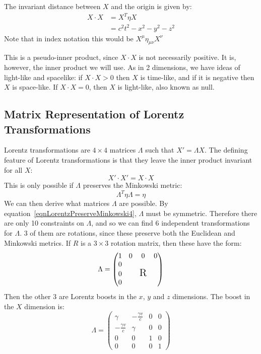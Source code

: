 \documentclass[../Main.tex]{subfiles}
\begin{document}
The invariant distance between $X$ and the origin is given by:
\begin{align*}
    X \cdot X &= X^T \eta X \\
    &= c^2 t^2 - x^2 - y^2 - z^2
\end{align*}
Note that in index notation this would be $X^\mu \eta_{\mu \nu} X^\nu$

This is a pseudo-inner product, since $X \cdot X$ is not necessarily positive. It is, however, the inner product we will use.
As in 2 dimensions, we have ideas of light-like and spacelike: if $X \cdot X > 0$ then $X$ is time-like, and if it is negative then $X$ is space-like. If $X \cdot X = 0$, then $X$ is light-like, also known as null.
\subsection{Matrix Representation of Lorentz Transformations}
Lorentz transformations are $4\times 4$ matrices $\Lambda$ such that $X' = \Lambda X$. The defining feature of Lorentz transformations is that they leave the inner product invariant for all $X$:
\begin{equation*}
    X'\cdot X' = X \cdot X
\end{equation*}
This is only possible if $\Lambda$ preserves the Minkowski metric:
\begin{equation}
    \Lambda^T \eta \Lambda = \eta
    \label{eqnLorentzPreserveMinkowski4}
\end{equation}
We can then derive what matrices $\Lambda$ are possible. By equation~\ref{eqnLorentzPreserveMinkowski4}, $\Lambda$ must be symmetric. Therefore there are only 10 constraints on $\Lambda$, and so we can find 6 independent transformations for $\Lambda$.
3 of them are rotations, since these preserve both the Euclidean and Minkowski metrics. If $R$ is a $3\times 3$ rotation matrix, then these have the form:
\begin{equation*}
    \Lambda =
    \begin{pmatrix}
        1 & 0 & 0 & 0 \\
        0 &   &   &   \\
        0 &   & \text{\Large R} &   \\
        0 &   &   &   \\
    \end{pmatrix}
\end{equation*}
Then the other 3 are Lorentz boosts in the $x$, $y$ and $z$ dimensions. The boost in the $X$ dimension is:
\begin{equation*}
    \Lambda =
    \begin{pmatrix}
        \gamma & -\frac{\gamma v}{c} & 0 & 0 \\
        -\frac{\gamma v}{c} & \gamma & 0 & 0 \\
        0 & 0 & 1 & 0 \\
        0 & 0 & 0 & 1
    \end{pmatrix}
\end{equation*}
\end{document}
